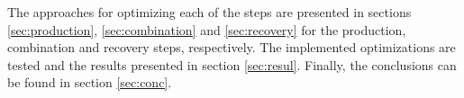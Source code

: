 The approaches for optimizing each of the steps are presented in sections \ref{sec:production}, \ref{sec:combination} and \ref{sec:recovery} for the production, combination and recovery steps, respectively.
The implemented optimizations are tested and the results presented in section \ref{sec:resul}.
Finally, the conclusions can be found in section \ref{sec:conc}.